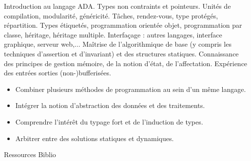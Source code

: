 \documentclass[10pt, a5paper]{report}
\begin{document}
{
Introduction au langage ADA. Types non contraints et pointeurs. Unités de compilation, modularité, généricité. Tâches, rendez-vous, type protégés, répartition. Types étiquetés, programmation orientée objet, programmation par classe, héritage, héritage multiple. Interfaçage : autres langages, interface graphique, serveur web,...}
{Maîtrise de l'algorithmique de base (y compris les techniques d'assertion et d'invariant) et des structures statiques. Connaissance des principes de gestion mémoire, de la notion d'état, de l'affectation. Expérience des entrées sorties (non-)bufferisées.}
{\begin{itemize}
\item Combiner plusieurs méthodes de programmation au sein d'un même langage.
\item Intégrer la notion d'abstraction des données et des traitements.
\item Comprendre l'intérêt du typage fort et de l'induction de types.
\item Arbitrer entre des solutions statiques et dynamiques.
\end{itemize}}
{Ressources} 
{Biblio} 

\vfill

\end{document}
